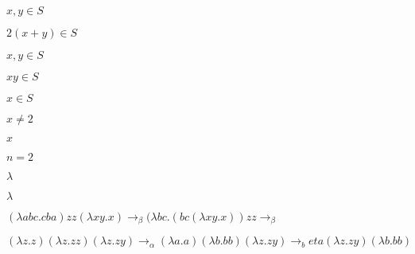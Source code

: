 \documentclass[10pt]{book}
\begin{document}
\begin{mdSnippets}
\begin{mdInlineSnippet}[4dd681d6895e10a343fda2e1bc698728]%
$x,y\in S$\end{mdInlineSnippet}%
\begin{mdInlineSnippet}[7f29155bf30f535900d25bd1a7d19cf5]%
$2(x+y)\in S$\end{mdInlineSnippet}%
\begin{mdInlineSnippet}[4dd681d6895e10a343fda2e1bc698728]%
$x,y\in S$\end{mdInlineSnippet}%
\begin{mdInlineSnippet}[94ab0a60ff9cfe6ad27f8238d7e0f075]%
$xy \in S$\end{mdInlineSnippet}%
\begin{mdInlineSnippet}%
$x\in S$\end{mdInlineSnippet}%
\begin{mdInlineSnippet}%
$x\not=2$\end{mdInlineSnippet}%
\begin{mdInlineSnippet}[9dd4e461268c8034f5c8564e155c67a6]%
$x$\end{mdInlineSnippet}%
\begin{mdInlineSnippet}[701653d734e23ac51c25137fb8831ba8]%
$n = 2$\end{mdInlineSnippet}%
\begin{mdInlineSnippet}[c6a6eb61fd9c6c913da73b3642ca147d]%
$\lambda$\end{mdInlineSnippet}%
\begin{mdInlineSnippet}[c6a6eb61fd9c6c913da73b3642ca147d]%
$\lambda$\end{mdInlineSnippet}%
\begin{mdInlineSnippet}%
$(\lambda a b c . c b a)zz(\lambda x y . x) \rightarrow_\beta (\lambda b c . (b c (\lambda x y . x))zz\rightarrow_\beta $\end{mdInlineSnippet}%
\begin{mdInlineSnippet}%
$(\lambda z . z)(\lambda z . z z)(\lambda z . z y) \rightarrow_\alpha (\lambda a . a)(\lambda b . b b)(\lambda z . z y) \rightarrow_beta (\lambda z . z y)(\lambda b . bb)$\end{mdInlineSnippet}%

\end{mdSnippets}
\end{document}
